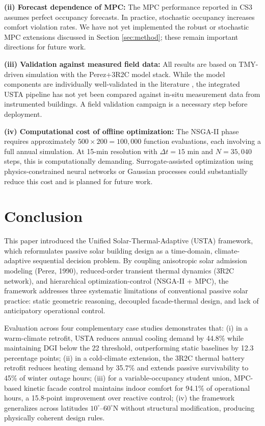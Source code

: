 \documentclass[preprint,12pt]{elsarticle}
\begin{document}
\textbf{(ii) Forecast dependence of MPC:} The MPC performance reported in CS3 assumes perfect occupancy forecasts. In practice, stochastic occupancy increases comfort violation rates. We have not yet implemented the robust or stochastic MPC extensions discussed in Section \ref{sec:method}; these remain important directions for future work.

\textbf{(iii) Validation against measured field data:} All results are based on TMY-driven simulation with the Perez+3R2C model stack. While the model components are individually well-validated in the literature \cite{perez1990,yang2024,lauster2014}, the integrated USTA pipeline has not yet been compared against in-situ measurement data from instrumented buildings. A field validation campaign is a necessary step before deployment.

\textbf{(iv) Computational cost of offline optimization:} The NSGA-II phase requires approximately $500 \times 200 = 100,000$ function evaluations, each involving a full annual simulation. At 15-min resolution with $\Delta t = 15$ min and $N = 35,040$ steps, this is computationally demanding. Surrogate-assisted optimization using physics-constrained neural networks \cite{gokhale2022} or Gaussian processes could substantially reduce this cost and is planned for future work.

\section{Conclusion}
\label{sec:conclusion}

This paper introduced the Unified Solar-Thermal-Adaptive (USTA) framework, which reformulates passive solar building design as a time-domain, climate-adaptive sequential decision problem. By coupling anisotropic solar admission modeling (Perez, 1990), reduced-order transient thermal dynamics (3R2C network), and hierarchical optimization-control (NSGA-II + MPC), the framework addresses three systematic limitations of conventional passive solar practice: static geometric reasoning, decoupled facade-thermal design, and lack of anticipatory operational control.

Evaluation across four complementary case studies demonstrates that: (i) in a warm-climate retrofit, USTA reduces annual cooling demand by 44.8\% while maintaining DGI below the 22 threshold, outperforming static baselines by 12.3 percentage points; (ii) in a cold-climate extension, the 3R2C thermal battery retrofit reduces heating demand by 35.7\% and extends passive survivability to 45\% of winter outage hours; (iii) for a variable-occupancy student union, MPC-based kinetic facade control maintains indoor comfort for 94.1\% of operational hours, a 15.8-point improvement over reactive control; (iv) the framework generalizes across latitudes $10^\circ$--$60^\circ$N without structural modification, producing physically coherent design rules.
\end{document}
